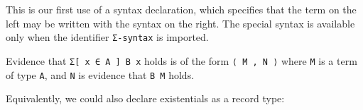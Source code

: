 \begin{fence}
\begin{code}%
\>[0]\AgdaSpace{}%
\AgdaSymbol{=}\AgdaSpace{}%
\<%
\\
\>[0]\AgdaSpace{}%
\AgdaSpace{}%
\<%
\\
\>[0]\AgdaSpace{}%
\AgdaSpace{}%
\AgdaSpace{}%
\AgdaSpace{}%
\AgdaSpace{}%
\AgdaSpace{}%
\AgdaSymbol{)}\AgdaSpace{}%
\AgdaSymbol{=}\AgdaSpace{}%
\AgdaFunction{Σ[}\AgdaSpace{}%
\AgdaSpace{}%
\AgdaSpace{}%
\AgdaSpace{}%
\AgdaFunction{]}\AgdaSpace{}%
\<%
\end{code}
\end{fence}

This is our first use of a syntax declaration, which specifies that the
term on the left may be written with the syntax on the right. The
special syntax is available only when the identifier \texttt{Σ-syntax}
is imported.

Evidence that \texttt{Σ{[}\ x\ ∈\ A\ {]}\ B\ x} holds is of the form
\texttt{⟨\ M\ ,\ N\ ⟩} where \texttt{M} is a term of type \texttt{A},
and \texttt{N} is evidence that \texttt{B\ M} holds.

Equivalently, we could also declare existentials as a record type:

\begin{fence}
\begin{code}%
\>[0]\AgdaSpace{}%
\AgdaSpace{}%
\AgdaSymbol{(}\AgdaSpace{}%
\AgdaSymbol{:}\AgdaSpace{}%
\AgdaSymbol{)}\AgdaSpace{}%
\AgdaSymbol{(}\AgdaSpace{}%
\AgdaSymbol{:}\AgdaSpace{}%
\AgdaSpace{}%
\AgdaSpace{}%
\AgdaSymbol{)}\AgdaSpace{}%
\AgdaSymbol{:}\AgdaSpace{}%
\AgdaSpace{}%
\<%
\\
\>[0][@{}l@{\AgdaIndent{0}}]%
\>[2]\<%
\\
\>[2][@{}l@{\AgdaIndent{0}}]%
\>[4]\AgdaSpace{}%
\AgdaSymbol{:}\AgdaSpace{}%
\<%
\\
%
\>[4]\AgdaSpace{}%
\AgdaSymbol{:}\AgdaSpace{}%
\AgdaSpace{}%
\<%
\end{code}
\end{fence}

